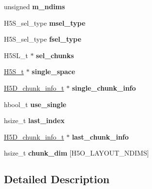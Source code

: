 \begin{DoxyCompactItemize}
unsigned {\bfseries m\+\_\+ndims}
\item 
\mbox{\label{struct_h5_d__chunk__map__t_afd32ba284032ffed1e8dfb42945fb281}} 
H5\+S\+\_\+sel\+\_\+type {\bfseries msel\+\_\+type}
\item 
\mbox{\label{struct_h5_d__chunk__map__t_a34aa546bf23cc38ecdc1e1d1b9ee96f9}} 
H5\+S\+\_\+sel\+\_\+type {\bfseries fsel\+\_\+type}
\item 
\mbox{\label{struct_h5_d__chunk__map__t_a7e697b0027965f32f640d241c554fedb}} 
H5\+S\+L\+\_\+t $\ast$ {\bfseries sel\+\_\+chunks}
\item 
\mbox{\label{struct_h5_d__chunk__map__t_a5a5cf5e01b160ed3eee818b21868f185}} 
\hyperlink{struct_h5_s__t}{H5\+S\+\_\+t} $\ast$ {\bfseries single\+\_\+space}
\item 
\mbox{\label{struct_h5_d__chunk__map__t_adff8e74db0e4684970399bab1e69bb6d}} 
\hyperlink{struct_h5_d__chunk__info__t}{H5\+D\+\_\+chunk\+\_\+info\+\_\+t} $\ast$ {\bfseries single\+\_\+chunk\+\_\+info}
\item 
\mbox{\label{struct_h5_d__chunk__map__t_a2e9fcd6d35717fa863d6fdc27551a0cc}} 
hbool\+\_\+t {\bfseries use\+\_\+single}
\item 
\mbox{\label{struct_h5_d__chunk__map__t_a93d568fb0f11253788e5febee3d63e60}} 
hsize\+\_\+t {\bfseries last\+\_\+index}
\item 
\mbox{\label{struct_h5_d__chunk__map__t_a45bd2db530d6844530d8a0185be8cfbd}} 
\hyperlink{struct_h5_d__chunk__info__t}{H5\+D\+\_\+chunk\+\_\+info\+\_\+t} $\ast$ {\bfseries last\+\_\+chunk\+\_\+info}
\item 
\mbox{\label{struct_h5_d__chunk__map__t_a796e5b55c0cf5143dddc161007bc8a39}} 
hsize\+\_\+t {\bfseries chunk\+\_\+dim} \mbox{[}H5\+O\+\_\+\+L\+A\+Y\+O\+U\+T\+\_\+\+N\+D\+I\+MS\mbox{]}
\end{DoxyCompactItemize}


\subsection{Detailed Description}


